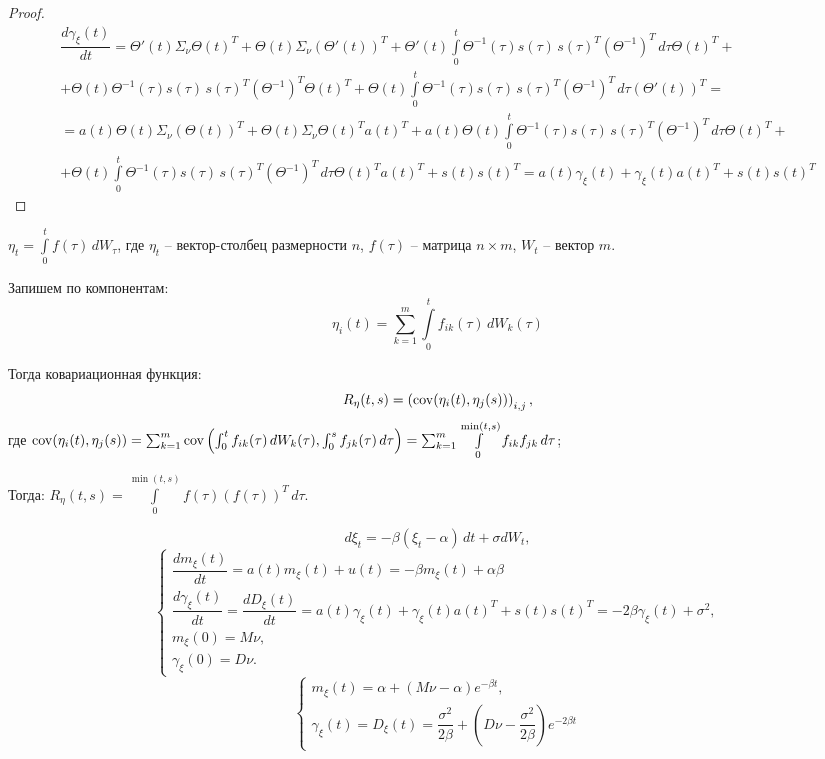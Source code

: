 \begin{proof}
  \begin{multline*}
    \dfrac{d\gamma_\xi(t)}{dt} =
    \Theta'(t) \Sigma_\nu \Theta(t)^T + \Theta(t) \Sigma_\nu (\Theta'(t))^T +
    \Theta'(t) \int\limits_0^t \Theta^{-1}(\tau) s(\tau) \, s(\tau)^T \left(\Theta^{-1}\right)^T \, d\tau \Theta(t)^T + \\
    + \Theta(t) \Theta^{-1}(\tau) s(\tau) \, s(\tau)^T \left(\Theta^{-1}\right)^T \Theta(t)^T +
    \Theta(t) \int\limits_0^t \Theta^{-1}(\tau) s(\tau) \, s(\tau)^T \left(\Theta^{-1}\right)^T \, d\tau \left( \Theta'(t) \right)^T = \\
    = a(t) \Theta(t) \Sigma_\nu \left( \Theta(t) \right)^T +
    \Theta(t) \Sigma_\nu \Theta(t)^T a(t)^T +
    a(t) \Theta(t) \int\limits_0^t \Theta^{-1}(\tau) s(\tau) \, s(\tau)^T \left(\Theta^{-1}\right)^T \, d\tau \Theta(t)^T + \\
    + \Theta(t) \int\limits_0^t \Theta^{-1}(\tau) s(\tau) \, s(\tau)^T \left(\Theta^{-1}\right)^T \, d\tau \Theta(t)^T a(t)^T + 
    s(t) s(t)^T = a(t) \gamma_\xi(t) + \gamma_\xi(t) a(t)^T + s(t) s(t)^T
  \end{multline*}
\end{proof}

\begin{remark}\label{remark:ito_covariance}
  $\eta_t = \int\limits_0^t f(\tau) \, dW_\tau$, где $\eta_t$ -- вектор-столбец размерности $n$,
  $f(\tau)$ -- матрица $n\times m$, $W_t$ -- вектор $m$.

  Запишем по компонентам:
  \[
    \eta_i (t) = \sum_{k=1}^m \int\limits_0^t f_{ik}(\tau) \, dW_k(\tau)
  \]

  Тогда ковариационная функция:
  \[
    R_\eta(t, s) = \left(\operatorname{cov}(\eta_i(t), \eta_j(s)) \right)_{i, j},
  \]
  где $\operatorname{cov}(\eta_i(t), \eta_j(s)) = \sum_{k=1}^m \operatorname{cov} \left( \int_0^t f_{ik}(\tau) \, dW_k(\tau),
  \int_0^s f_{jk}(\tau) \, d\tau \right) = \sum_{k=1}^m \int\limits_0^{\min(t, s)} f_{ik} f_{jk} \, d\tau$;

  Тогда: $R_\eta(t, s) = \int\limits_0^{\min(t, s)} f(\tau) (f(\tau))^T \, d\tau$.
\end{remark}

\begin{ex}
  \[
    d\xi_t = - \beta (\xi_t - \alpha) \, dt + \sigma dW_t,
  \]
  \[
    \begin{cases}
      \dfrac{dm_\xi(t)}{dt} = a(t) m_\xi(t) + u(t) = - \beta m_\xi(t) + \alpha\beta \\
      \dfrac{d\gamma_\xi(t)}{dt} = \dfrac{d D_\xi(t)}{dt} = a(t) \gamma_\xi(t) + \gamma_\xi(t) a(t)^T + s(t) s(t)^T = - 2 \beta \gamma_\xi(t) + \sigma^2, \\
      m_\xi(0) = M\nu, \\
      \gamma_\xi(0) = D\nu.
    \end{cases}
  \]
  \[
    \begin{cases}
      m_\xi(t) = \alpha + (M\nu - \alpha) e^{-\beta t}, \\
      \gamma_\xi(t) = D_\xi(t) = \dfrac{\sigma^2}{2\beta} + \left(D\nu - \dfrac{\sigma^2}{2\beta}\right) e^{-2\beta t}
    \end{cases}
    
  \]
\end{ex}
